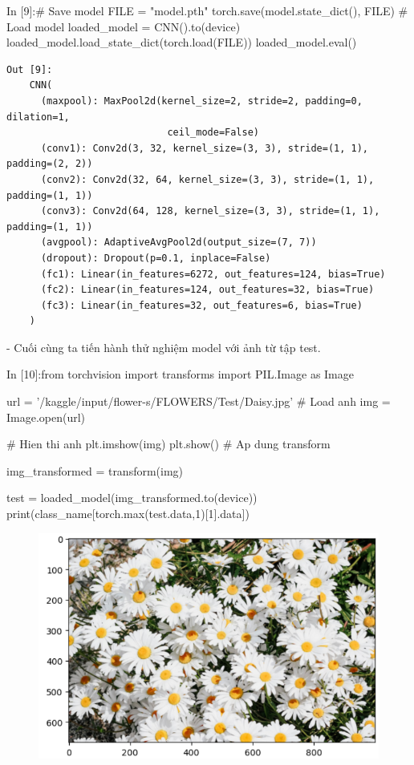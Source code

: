 \documentclass[12pt, a4paper]{article}
\begin{document}
\begin{python}
In [9]:# Save model
        FILE = "model.pth"
        torch.save(model.state_dict(), FILE)
        # Load model
        loaded_model = CNN().to(device)
        loaded_model.load_state_dict(torch.load(FILE)) 
        loaded_model.eval()
\end{python}
\newpage
\begin{verbatim}
Out [9]:
    CNN(
      (maxpool): MaxPool2d(kernel_size=2, stride=2, padding=0, dilation=1, 
                            ceil_mode=False)
      (conv1): Conv2d(3, 32, kernel_size=(3, 3), stride=(1, 1), padding=(2, 2))
      (conv2): Conv2d(32, 64, kernel_size=(3, 3), stride=(1, 1), padding=(1, 1))
      (conv3): Conv2d(64, 128, kernel_size=(3, 3), stride=(1, 1), padding=(1, 1))
      (avgpool): AdaptiveAvgPool2d(output_size=(7, 7))
      (dropout): Dropout(p=0.1, inplace=False)
      (fc1): Linear(in_features=6272, out_features=124, bias=True)
      (fc2): Linear(in_features=124, out_features=32, bias=True)
      (fc3): Linear(in_features=32, out_features=6, bias=True)
    )
\end{verbatim}
\par - Cuối cùng ta tiến hành thử nghiệm model với ảnh từ tập test.
\begin{python}
In [10]:from torchvision import transforms
        import PIL.Image as Image
        
        url = '/kaggle/input/flower-s/FLOWERS/Test/Daisy.jpg'
        # Load anh
        img = Image.open(url)
        
        # Hien thi anh
        plt.imshow(img)
        plt.show()
        # Ap dung transform
        
        img_transformed = transform(img)
        
        test = loaded_model(img_transformed.to(device))
        print(class_name[torch.max(test.data,1)[1].data])
\end{python}
\begin{figure}[h] %
    \includegraphics[scale = 0.65]{Img/Flowers/P4.png}
\end{figure}
\end{document}
